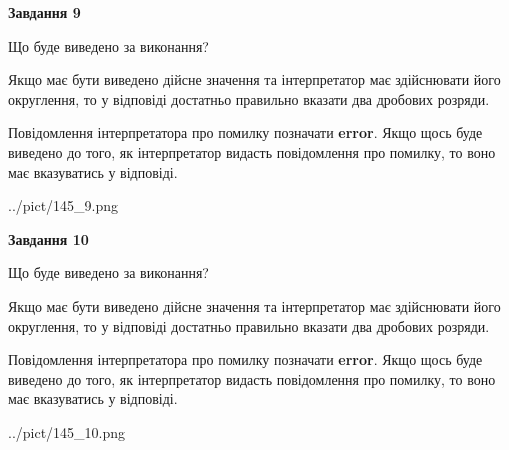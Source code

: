 \documentclass[12pt, ukrainian]{article}
\begin{document}
{\begin {Large}
{\begin {center}\textbf{Завдання 9}\end {center}}\par
Що буде виведено за виконання? \par

Якщо має бути виведено дійсне значення та інтерпретатор має здійснювати його округлення, 
то у відповіді достатньо правильно вказати два дробових розряди.

Повідомлення інтерпретатора про помилку позначати \textbf{error}.
Якщо щось буде виведено до того, як інтерпретатор видасть повідомлення про помилку, 
то воно має вказуватись у відповіді. \par

\begin{center}
	{../pict/145_9.png}
\end{center}
\newpage

{\begin {center}\textbf{Завдання 10}\end {center}}\par
Що буде виведено за виконання? \par

Якщо має бути виведено дійсне значення та інтерпретатор має здійснювати його округлення, 
то у відповіді достатньо правильно вказати два дробових розряди.

Повідомлення інтерпретатора про помилку позначати \textbf{error}.
Якщо щось буде виведено до того, як інтерпретатор видасть повідомлення про помилку, 
то воно має вказуватись у відповіді. \par

\begin{center}
	{../pict/145_10.png}
\end{center}
\newpage

\end {Large}}
\end{document}
